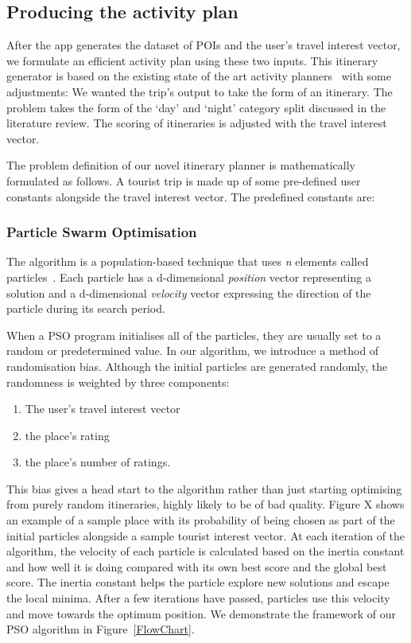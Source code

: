 
\subsection{Producing the activity plan}

After the app generates the dataset of POIs and the
user's travel interest vector, we formulate an
efficient activity plan using these two inputs. This
itinerary generator is based on the existing state of
the art activity planners~\cite{Sylejmani2017, Wisittipanich2020}
with some adjustments: We wanted the trip's output to take the
form of an itinerary.  The problem takes the form of
the `day' and `night'  category split discussed in
the literature review.  The scoring of itineraries is adjusted
with the travel interest vector.

The problem definition of our novel itinerary planner
is mathematically formulated as follows. A tourist trip is made up
of some pre-defined user constants alongside the travel interest
vector. The predefined constants are:
\\


\subsubsection{Particle Swarm Optimisation}

The algorithm is a population-based technique that uses \textit{n}
elements called particles~\cite{Kennedy}. Each particle has a
d-dimensional \textit{position} vector representing a solution
and a d-dimensional \textit{velocity} vector expressing the
direction of the particle during its search period. 

When a PSO program initialises all of the particles,
they are usually set to a random or predetermined
value. In our algorithm, we introduce a method of
randomisation bias. Although the initial particles are
generated randomly, the randomness is weighted 
by three components: 
\begin{enumerate}
    
    \item The user's travel interest vector 
    \item the place's rating 
    \item the place's number of ratings.

\end{enumerate}
This bias gives a
head start to the algorithm rather than just starting
optimising from purely random itineraries, highly
likely to be of bad quality. Figure X
shows an example of a sample place with its
probability of being chosen as part of the initial
particles alongside a sample tourist interest vector.
At each iteration of the algorithm, the velocity of
each particle is calculated based on the inertia
constant and how well it is doing compared with its
own best score and the global best score. The
inertia constant helps the particle explore new
solutions and escape the local minima. After a few
iterations have passed, particles use this velocity
and move towards the optimum position. We demonstrate
the framework of our PSO algorithm in Figure~\ref{FlowChart}.

